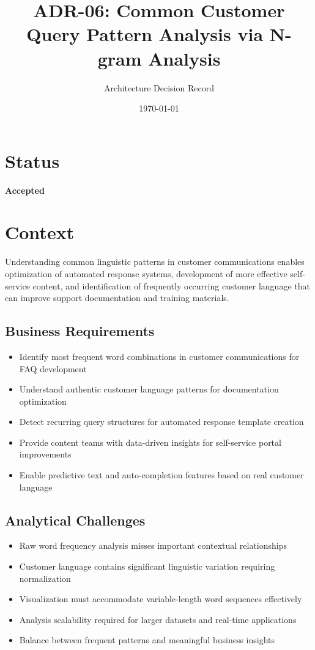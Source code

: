\documentclass[11pt]{article}
\title{\textbf{ADR-06: Common Customer Query Pattern Analysis via N-gram Analysis}}
\author{Architecture Decision Record}
\date{\today}
\begin{document}
\maketitle

\section{Status}
\textbf{Accepted}

\section{Context}

Understanding common linguistic patterns in customer communications enables optimization of automated response systems, development of more effective self-service content, and identification of frequently occurring customer language that can improve support documentation and training materials.

\subsection{Business Requirements}
\begin{itemize}
\item Identify most frequent word combinations in customer communications for FAQ development
\item Understand authentic customer language patterns for documentation optimization
\item Detect recurring query structures for automated response template creation
\item Provide content teams with data-driven insights for self-service portal improvements
\item Enable predictive text and auto-completion features based on real customer language
\end{itemize}

\subsection{Analytical Challenges}
\begin{itemize}
\item Raw word frequency analysis misses important contextual relationships
\item Customer language contains significant linguistic variation requiring normalization
\item Visualization must accommodate variable-length word sequences effectively
\item Analysis scalability required for larger datasets and real-time applications
\item Balance between frequent patterns and meaningful business insights
\end{itemize}
\end{document}
